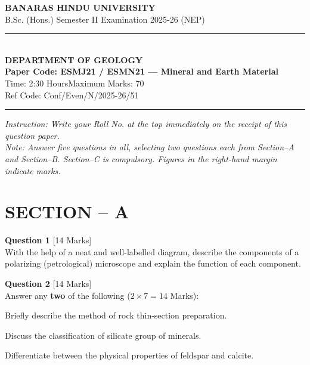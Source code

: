 \documentclass[11pt,a4paper]{article}
\begin{document}
\begin{center}
  {\large\bfseries BANARAS HINDU UNIVERSITY}\\[2pt]
  {\normalsize B.Sc. (Hons.) Semester II Examination 2025-26 (NEP)}\\[6pt]
  \rule{0.8\linewidth}{0.5pt}\\[6pt]
  {\large\bfseries DEPARTMENT OF GEOLOGY}\\[4pt]
  {\large\bfseries Paper Code: ESMJ21 / ESMN21 --- Mineral and Earth Material}\\[4pt]
  {\normalsize Time: 2:30 Hours\hfill Maximum Marks: 70}\\[2pt]
  {\small Ref Code: Conf/Even/N/2025-26/51}
\end{center}

\rule{\linewidth}{0.4pt}\smallskip



\noindent   \textit{Instruction: Write your Roll No. at the top immediately on the receipt of this question paper.}\\[2pt]



\noindent   \textit{Note: Answer five questions in all, selecting two questions each from Section--A and Section--B. Section--C is compulsory. Figures in the right-hand margin indicate marks.}
\bigskip

\section*{SECTION -- A}




\noindent   \textbf{Question 1} \hfill [14 Marks]\\
With the help of a neat and well-labelled diagram, describe the components of a polarizing (petrological) microscope and explain the function of each component.

\bigskip




\noindent   \textbf{Question 2} \hfill [14 Marks]\\
Answer any   \textbf{two} of the following ($2  \times 7 = 14$ Marks):

\begin{parts}
  \item Briefly describe the method of rock thin-section preparation.
  \item Discuss the classification of silicate group of minerals.
  \item Differentiate between the physical properties of feldspar and calcite.
\end{parts}
\end{document}
